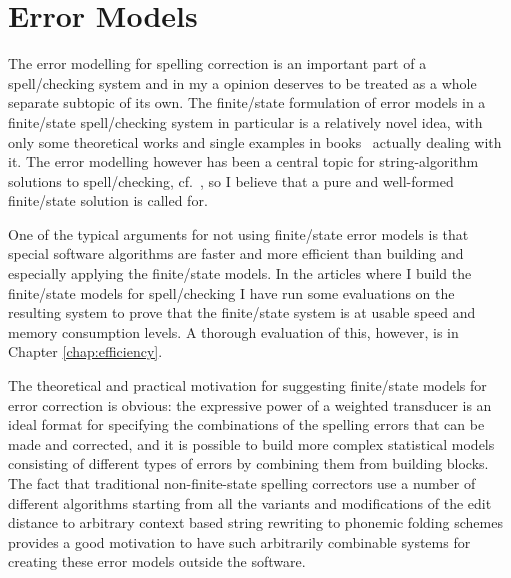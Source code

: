 \documentclass[officiallayout]{unihelcompling}
\begin{document}
\chapter{Error Models}
\label{chap:error-models}

The error modelling for spelling correction is an important part of a
spell\-/checking system and in my a opinion deserves to be treated as a whole
separate subtopic of its own. The finite\-/state formulation of error models in
a finite\-/state spell\-/checking system in particular is a relatively novel
idea, with only some theoretical works
\citep{agata2002typographical,mohri2003edit} and single examples in
books~\citep{beesley2003finite} actually dealing with it.  The error modelling
however has been a central topic for string-algorithm solutions to
spell\-/checking,
cf.~\citet{kukich1992spelling,mitton2009ordering,deorowicz2005correcting}, so I
believe that a pure and well-formed finite\-/state solution is called for.

One of the typical arguments for not using finite\-/state error models is that
special software algorithms are faster and more efficient than building and
especially applying the finite\-/state models. In the articles where I build
the finite\-/state models for spell\-/checking I have run some evaluations on
the resulting system to prove that the finite\-/state system is at usable speed
and memory consumption levels. A thorough evaluation of this, however, is in
Chapter \ref{chap:efficiency}.

The theoretical and practical motivation for suggesting finite\-/state models
for error correction is obvious: the expressive power of a weighted transducer
is an ideal format for specifying the combinations of the spelling errors that
can be made and corrected, and it is possible to build more complex statistical
models consisting of different types of errors by combining them from building
blocks. The fact that traditional non-finite-state spelling correctors use a
number of different algorithms starting from all the variants and modifications
of the edit distance to arbitrary context based string rewriting to phonemic
folding schemes provides a good motivation to have such arbitrarily combinable
systems for creating these error models outside the software.
\end{document}
